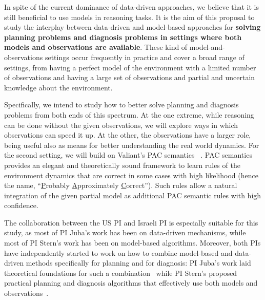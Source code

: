 \documentclass[12pt]{article}
\begin{document}
In spite of the current dominance of data-driven approaches, we believe that it is still beneficial to use models in reasoning tasks.
It is the aim of this proposal to study the interplay between data-driven and model-based approaches 
for {\bf solving planning problems and diagnosis problems in settings where both models and observations are available}. These kind of model-and-observations settings occur frequently in practice and cover a broad range of settings, from having a perfect model of the environment with a limited  number of observations and having a large set of observations and partial and uncertain knowledge about the environment. 


Specifically, we intend to study how to better solve planning and diagnosis problems from both ends of this spectrum.
At the one extreme, while reasoning can be done without the given observations, we will explore ways in which observations can speed it up. 
At the other, the observations have a larger role, being useful also as means for better understanding the real world dynamics. 
For the second setting, we will build on Valiant's PAC semantics ~\cite{valiant2000robustLogics,valiant2000neuroidal}. %
PAC semantics provides an elegant and theoretically sound framework to learn 
rules of the environment dynamics that are correct in some cases with high likelihood (hence the name, ``{\underline P}robably {\underline A}pproximately {\underline C}orrect''). Such rules allow a natural integration of the given partial model as additional PAC semantic rules with high confidence. %


The collaboration between the US PI and Israeli PI is especially suitable for this study, as most of PI Juba's work has been on data-driven mechanisms, while most of PI Stern's work has been on model-based algorithms. Moreover, both PIs have independently started to work on how to combine model-based and data-driven methods specifically for planning and for diagnosis: PI Juba's work laid theoretical foundations for such a combination~\cite{juba2016aaai,juba2016jmlr} while PI Stern's proposed practical planning and diagnosis algorithms that effectively use both models and observations~\cite{elmishali2016dataAugmented,stern2011probably,stern2012search}.
\end{document}
